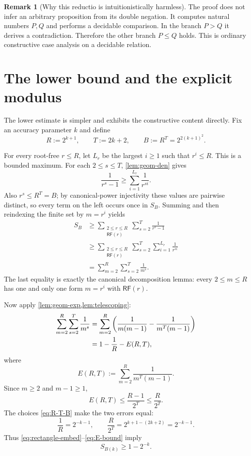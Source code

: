 \documentclass[11pt]{article}
\theoremstyle{definition}
\newtheorem{remark}[theorem]{Remark}
\newcommand{\RF}{\mathsf{RF}}
\begin{document}
\begin{remark}[Why this reductio is intuitionistically harmless]
The proof does not infer an arbitrary proposition from its double negation.
It computes natural numbers $P,Q$ and performs a decidable comparison.  In the
branch $P>Q$ it derives a contradiction.  Therefore the other branch $P\le Q$
holds.  This is ordinary constructive case analysis on a decidable relation.
\end{remark}

\section{The lower bound and the explicit modulus}

The lower estimate is simpler and exhibits the constructive content directly.
Fix an accuracy parameter $k$ and define
\begin{equation}\label{eq:R-T-B}
  R:=2^{k+1},
  \qquad
  T:=2k+2,
  \qquad
  B:=R^T=2^{2(k+1)^2}.
\end{equation}

For every root-free $r\le R$, let $L_r$ be the largest $i\ge1$ such that
$r^i\le R$.  This is a bounded maximum.  For each $2\le s\le T$,
\cref{lem:geom-den} gives
\[
  \frac1{r^s-1}\ge\sum_{i=1}^{L_r}\frac1{r^{si}}.
\]
Also $r^s\le R^T=B$; by canonical-power injectivity these values are
pairwise distinct, so every term on the left occurs once in $S_B$.  Summing
and then reindexing the finite set by $m=r^i$ yields
\begin{equation}\label{eq:rectangle-embed}
\begin{aligned}
  S_B
  &\ge
  \sum_{\substack{2\le r\le R\\\RF(r)}}
  \sum_{s=2}^{T}\frac1{r^s-1}\\
  &\ge
  \sum_{\substack{2\le r\le R\\\RF(r)}}
  \sum_{s=2}^{T}\sum_{i=1}^{L_r}\frac1{r^{si}}\\
  &=\sum_{m=2}^{R}\sum_{s=2}^{T}\frac1{m^s}.
\end{aligned}
\end{equation}
The last equality is exactly the canonical decomposition lemma: every
$2\le m\le R$ has one and only one form $m=r^i$ with $\RF(r)$.

Now apply \cref{lem:geom-exp,lem:telescoping}:
\begin{align}
 \sum_{m=2}^{R}\sum_{s=2}^{T}\frac1{m^s}
 &=\sum_{m=2}^{R}
   \left(\frac1{m(m-1)}-\frac1{m^T(m-1)}\right)\notag\\
 &=1-\frac1R-E(R,T),\label{eq:lower-exact}
\end{align}
where
\[
  E(R,T):=\sum_{m=2}^{R}\frac1{m^T(m-1)}.
\]
Since $m\ge2$ and $m-1\ge1$,
\begin{equation}\label{eq:E-bound}
  E(R,T)\le\frac{R-1}{2^T}\le\frac{R}{2^T}.
\end{equation}
The choices \eqref{eq:R-T-B} make the two errors equal:
\[
  \frac1R=2^{-k-1},
  \qquad
  \frac{R}{2^T}=2^{k+1-(2k+2)}=2^{-k-1}.
\]
Thus \eqref{eq:rectangle-embed}--\eqref{eq:E-bound} imply
\begin{equation}\label{eq:lower-final}
  S_{B(k)}\ge1-2^{-k}.
\end{equation}
\end{document}

